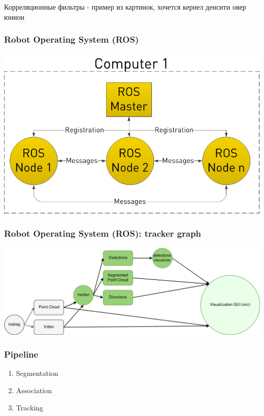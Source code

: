 \documentclass[xcolor=table,usenames,dvipsnames]{beamer}
\begin{document}
\begin{frame}
Корреляционные фильтры - пример из картинок, хочется кернел денсити овер юнион
\end{frame}
\begin{frame}
\frametitle{Robot Operating System (ROS)}
\includegraphics[height = 0.7\textheight]{img/ros.png}
\begin{flushright}
\end{flushright}
\end{frame}
\begin{frame}
\frametitle{Robot Operating System (ROS): tracker graph}
\includegraphics[width = \textwidth]{img/ros_graph.png}
\end{frame}
\begin{frame}
\frametitle{Pipeline}
\begin{enumerate}
\item Segmentation
\item Association
\item Tracking
\end{enumerate}
\end{frame}
\end{document}
